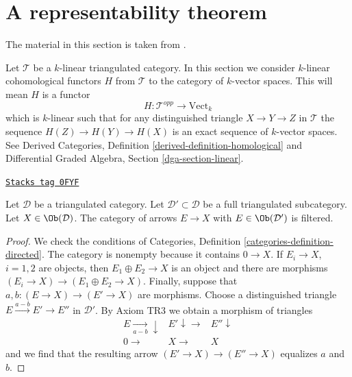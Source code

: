 \section{A representability theorem}
\label{equiv-section-bondal-van-den-bergh}
The material in this section is taken from \cite{BvdB}.

\medskip\noindent
Let $\mathcal{T}$ be a $k$-linear triangulated category.
In this section we consider $k$-linear cohomological functors
$H$ from $\mathcal{T}$ to the category of $k$-vector spaces.
This will mean $H$ is a functor
$$
H : \mathcal{T}^{opp} \longrightarrow \text{Vect}_k
$$
which is $k$-linear such that for any distinguished triangle
$X \to Y \to Z$ in $\mathcal{T}$ the sequence $H(Z) \to H(Y) \to H(X)$
is an exact sequence of $k$-vector spaces. See
Derived Categories, Definition \ref{derived-definition-homological}
and Differential Graded Algebra, Section \ref{dga-section-linear}.

\begin{lemma}
\label{equiv-lemma-maps-from-compact-filtered}
\href{https://stacks.math.columbia.edu/tag/0FYF}{\texttt{Stacks tag 0FYF}}

Let $\mathcal{D}$ be a triangulated category. Let
$\mathcal{D}' \subset \mathcal{D}$ be a full triangulated subcategory. Let
$X \in \Ob(\mathcal{D})$. The category of arrows $E \to X$ with
$E \in \Ob(\mathcal{D}')$ is filtered.
\end{lemma}

\begin{proof}
We check the conditions of
Categories, Definition \ref{categories-definition-directed}.
The category is nonempty because it contains $0 \to X$.
If $E_i \to X$, $i = 1, 2$ are objects, then $E_1 \oplus E_2 \to X$
is an object and there are morphisms $(E_i \to X) \to (E_1 \oplus E_2 \to X)$.
Finally, suppose that $a, b : (E \to X) \to (E' \to X)$ are morphisms.
Choose a distinguished triangle $E \xrightarrow{a - b} E' \to E''$
in $\mathcal{D}'$. By Axiom TR3 we obtain a morphism of triangles
$$
\begin{array}{ccc}E \underset{a - b}{\longrightarrow}\downarrow & E' \downarrow\longrightarrow & E'' \downarrow \\ 0 \longrightarrow & X \longrightarrow & X\end{array}
$$
and we find that the resulting arrow $(E' \to X) \to (E'' \to X)$
equalizes $a$ and $b$.
\end{proof}

